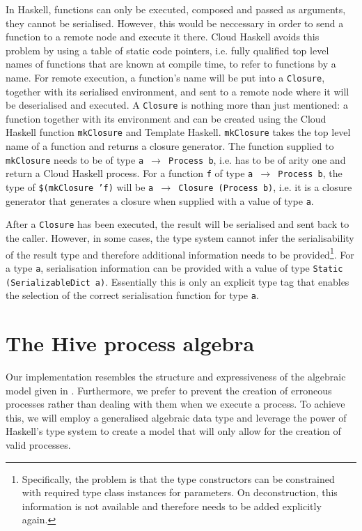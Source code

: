 In Haskell, functions can only be executed, composed and passed as arguments, they cannot be serialised. However, this would be neccessary in order to send a function to a remote node and execute it there. Cloud Haskell avoids this problem by using a table of static code pointers, i.e. fully qualified top level names of functions that are known at compile time, to refer to functions by a name. For remote execution, a function's name will be put into a \texttt{Closure}, together with its serialised environment, and sent to a remote node where it will be deserialised and executed. A \texttt{Closure} is nothing more than just mentioned: a function together with its environment \cite{Epstein:2011:THC:2034675.2034690} and can be created using the \textsf{Cloud Haskell} function \texttt{mkClosure} and \textsf{Template Haskell}. \texttt{mkClosure} takes the top level name of a function and returns a closure generator. The function supplied to \texttt{mkClosure} needs to be of type \texttt{a $\to$ Process b}, i.e. has to be of arity one and return a \textsf{Cloud Haskell} process. For a function \texttt{f} of type \texttt{a $\to$ Process b}, the type of \texttt{\$(mkClosure 'f)} will be \texttt{a $\to$ Closure (Process b)}, i.e. it is a closure generator that generates a closure when supplied with a value of type \texttt{a}.

After a \texttt{Closure} has been executed, the result will be serialised and sent back to the caller. However, in some cases, the type system cannot infer the serialisability of the result type and therefore additional information needs to be provided\footnote{Specifically, the problem is that the type constructors can be constrained with required type class instances for parameters. On deconstruction, this information is not available and therefore needs to be added explicitly again.}. For a type \texttt{a}, serialisation information can be provided with a value of type \texttt{Static (SerializableDict a)}. Essentially this is only an explicit type tag that enables the selection of the correct serialisation function for type \texttt{a}.

\section{The Hive process algebra}
Our implementation resembles the structure and expressiveness of the algebraic model given in . Furthermore, we prefer to prevent the creation of erroneous processes rather than dealing with them when we execute a process. To achieve this, we will employ a generalised algebraic data type and leverage the power of Haskell's type system to create a model that will only allow for the creation of valid processes.

